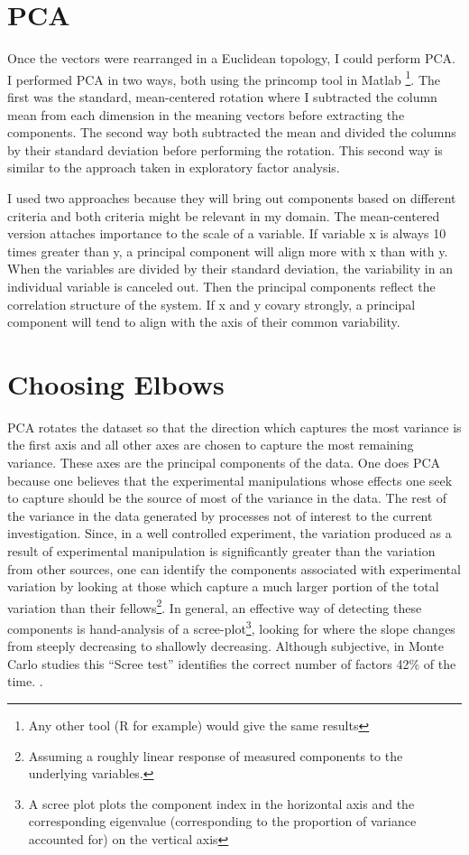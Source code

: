 \section{PCA}

Once the vectors were rearranged in a Euclidean topology, I could perform PCA. 
I performed PCA in two ways, both using the princomp tool in Matlab \footnote{Any other tool (R for example) would give the same 
results}. The first was the standard, mean-centered rotation where I subtracted 
the column mean from each dimension in the meaning vectors before extracting the 
components. The second way both subtracted the mean and divided the columns by 
their standard deviation before performing the rotation. This second way is 
similar to the approach taken in exploratory factor analysis. 

I used two approaches because they will bring out components based on different 
criteria and both criteria might be relevant in my domain. The mean-centered 
version attaches importance to the scale of a variable. If variable x is always 
10 times greater than y, a principal component will align more with x than with 
y. When the variables are divided by their standard 
deviation, the variability in an individual variable is canceled out. Then the 
principal components reflect the correlation structure of the system. If x and y 
covary strongly, a principal component will tend to align with the axis of their 
common variability.

\section{Choosing Elbows}

PCA rotates the dataset so that the direction which captures the most
variance is the first axis and all other axes are chosen to capture
the most remaining variance. These axes are the principal components
of the data. One does PCA because one believes that the experimental
manipulations whose effects one seek to capture should be the source
of most of the variance in the data. The rest of the variance in the
data generated by processes not of interest to the current
investigation. Since, in a well controlled experiment, the variation
produced as a result of experimental manipulation is significantly
greater than the variation from other sources, one can identify the
components associated with experimental variation by looking at those
which capture a much larger portion of the total variation than their
fellows\footnote{Assuming a roughly linear response of measured
  components to the underlying variables.}. In general, an effective
way of detecting these components is hand-analysis of a
scree-plot\footnote{A scree plot plots the component index in the
  horizontal axis and the corresponding eigenvalue (corresponding to
  the proportion of variance accounted for) on the vertical axis},
looking for where the slope changes from steeply decreasing to
shallowly decreasing. Although subjective, in Monte Carlo studies this
``Scree test'' identifies the correct number of factors 42\% of the
time. .

